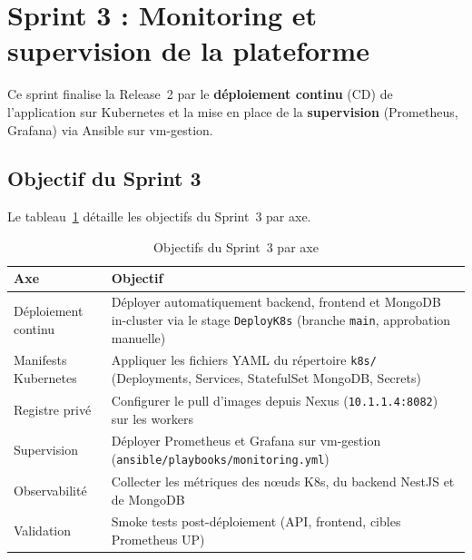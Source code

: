 
\section[Sprint 3 : Monitoring et supervision de la plateforme]%
{Sprint 3 : Monitoring et supervision de la plateforme}

Ce sprint finalise la Release~2 par le \textbf{déploiement continu} (CD) de l'application
sur Kubernetes et la mise en place de la \textbf{supervision} (Prometheus, Grafana) via
Ansible sur vm-gestion.


\subsection{Objectif du Sprint 3}

Le tableau~\ref{tab:r2-s3-objectifs} détaille les objectifs du Sprint~3 par axe.

\begin{table}[H]
\centering
\caption{Objectifs du Sprint~3 par axe}
\label{tab:r2-s3-objectifs}
\footnotesize
\renewcommand{\arraystretch}{1.1}
\setlength{\tabcolsep}{6pt}
\begin{tabular}{|p{2.8cm}|p{9.2cm}|}
\hline
\textbf{Axe} & \textbf{Objectif} \\
\hline
Déploiement continu &
  Déployer automatiquement backend, frontend et MongoDB in-cluster via le stage
  \texttt{DeployK8s} (branche \texttt{main}, approbation manuelle) \\
\hline
Manifests Kubernetes &
  Appliquer les fichiers YAML du répertoire \texttt{k8s/} (Deployments, Services,
  StatefulSet MongoDB, Secrets) \\
\hline
Registre privé &
  Configurer le pull d'images depuis Nexus (\texttt{10.1.1.4:8082}) sur les workers \\
\hline
Supervision &
  Déployer Prometheus et Grafana sur vm-gestion (\texttt{ansible/playbooks/monitoring.yml}) \\
\hline
Observabilité &
  Collecter les métriques des nœuds K8s, du backend NestJS et de MongoDB \\
\hline
Validation &
  Smoke tests post-déploiement (API, frontend, cibles Prometheus UP) \\
\hline
\end{tabular}
\end{table}

